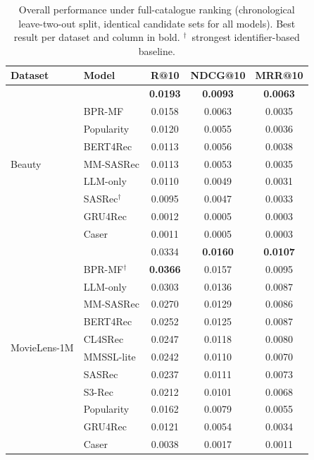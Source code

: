 \begin{table}[t]
\centering
\caption{Overall performance under full-catalogue ranking (chronological
leave-two-out split, identical candidate sets for all models). Best result per
dataset and column in bold. $^\dagger$~strongest identifier-based baseline.}
\label{tab:overall}
\small
\begin{tabular}{llccc}
\toprule
\textbf{Dataset} & \textbf{Model} & \textbf{R@10} & \textbf{NDCG@10} & \textbf{MRR@10} \\
\midrule
\multirow{9}{*}{Beauty}
 & \textbf{\model{}}    & \textbf{0.0193} & \textbf{0.0093} & \textbf{0.0063} \\
 & BPR-MF               & 0.0158 & 0.0063 & 0.0035 \\
 & Popularity           & 0.0120 & 0.0055 & 0.0036 \\
 & BERT4Rec             & 0.0113 & 0.0056 & 0.0038 \\
 & MM-SASRec            & 0.0113 & 0.0053 & 0.0035 \\
 & LLM-only             & 0.0110 & 0.0049 & 0.0031 \\
 & SASRec$^\dagger$     & 0.0095 & 0.0047 & 0.0033 \\
 & GRU4Rec              & 0.0012 & 0.0005 & 0.0003 \\
 & Caser                & 0.0011 & 0.0005 & 0.0003 \\
\midrule
\multirow{12}{*}{MovieLens-1M}
 & \textbf{\model{}}    & 0.0334 & \textbf{0.0160} & \textbf{0.0107} \\
 & BPR-MF$^\dagger$     & \textbf{0.0366} & 0.0157 & 0.0095 \\
 & LLM-only             & 0.0303 & 0.0136 & 0.0087 \\
 & MM-SASRec            & 0.0270 & 0.0129 & 0.0086 \\
 & BERT4Rec             & 0.0252 & 0.0125 & 0.0087 \\
 & CL4SRec              & 0.0247 & 0.0118 & 0.0080 \\
 & MMSSL-lite           & 0.0242 & 0.0110 & 0.0070 \\
 & SASRec               & 0.0237 & 0.0111 & 0.0073 \\
 & S3-Rec               & 0.0212 & 0.0101 & 0.0068 \\
 & Popularity           & 0.0162 & 0.0079 & 0.0055 \\
 & GRU4Rec              & 0.0121 & 0.0054 & 0.0034 \\
 & Caser                & 0.0038 & 0.0017 & 0.0011 \\
\bottomrule
\end{tabular}
\end{table}

